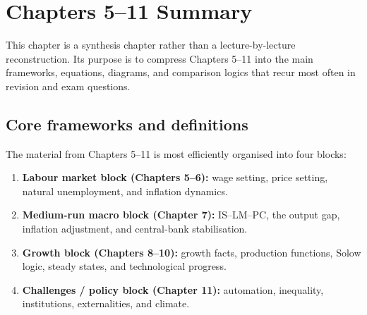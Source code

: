 \documentclass[12pt]{article}
\begin{document}
\newpage

\section{Chapters 5--11 Summary}

This chapter is a synthesis chapter rather than a lecture-by-lecture reconstruction. Its purpose is to compress Chapters 5--11 into the main frameworks, equations, diagrams, and comparison logics that recur most often in revision and exam questions.

\subsection{Core frameworks and definitions}

The material from Chapters 5--11 is most efficiently organised into four blocks:
\begin{enumerate}[leftmargin=1.5em]
    \item \textbf{Labour market block (Chapters 5--6):} wage setting, price setting, natural unemployment, and inflation dynamics.
    \item \textbf{Medium-run macro block (Chapter 7):} IS--LM--PC, the output gap, inflation adjustment, and central-bank stabilisation.
    \item \textbf{Growth block (Chapters 8--10):} growth facts, production functions, Solow logic, steady states, and technological progress.
    \item \textbf{Challenges / policy block (Chapter 11):} automation, inequality, institutions, externalities, and climate.
\end{enumerate}
\end{document}

